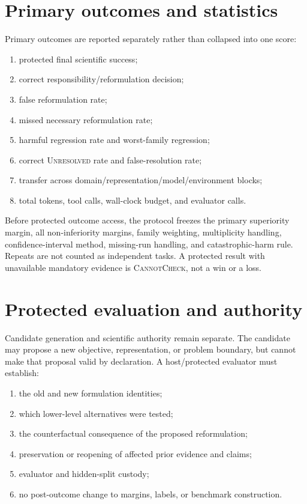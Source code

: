\documentclass[11pt]{article}
\begin{document}
\section{Primary outcomes and statistics}
Primary outcomes are reported separately rather than collapsed into one score:
\begin{enumerate}[leftmargin=*]
    \item protected final scientific success;
    \item correct responsibility/reformulation decision;
    \item false reformulation rate;
    \item missed necessary reformulation rate;
    \item harmful regression rate and worst-family regression;
    \item correct \textsc{Unresolved} rate and false-resolution rate;
    \item transfer across domain/representation/model/environment blocks;
    \item total tokens, tool calls, wall-clock budget, and evaluator calls.
\end{enumerate}

Before protected outcome access, the protocol freezes the primary superiority margin, all non-inferiority margins, family weighting, multiplicity handling, confidence-interval method, missing-run handling, and catastrophic-harm rule. Repeats are not counted as independent tasks. A protected result with unavailable mandatory evidence is \textsc{CannotCheck}, not a win or a loss.

\section{Protected evaluation and authority}
Candidate generation and scientific authority remain separate. The candidate may propose a new objective, representation, or problem boundary, but cannot make that proposal valid by declaration. A host/protected evaluator must establish:
\begin{enumerate}[leftmargin=*]
    \item the old and new formulation identities;
    \item which lower-level alternatives were tested;
    \item the counterfactual consequence of the proposed reformulation;
    \item preservation or reopening of affected prior evidence and claims;
    \item evaluator and hidden-split custody;
    \item no post-outcome change to margins, labels, or benchmark construction.
\end{enumerate}
\end{document}
